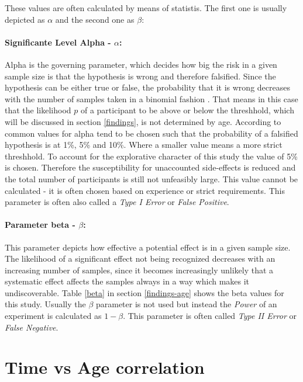             These values are often calculated by means of statistis. The first one is usually depicted as $\alpha$ and the second one as $\beta$:

            \paragraph{Significante Level Alpha - $\alpha$:} Alpha is the governing parameter, which decides how big the risk in a given sample size is that the hypothesis is wrong and therefore falsified. Since the hypothesis can be either true or false, the probability that it is wrong decreases with the number of samples taken in a binomial fashion \cite[103]{Siebertz.2017}. That means in this case that the likelihood $p$ of a participant to be above or below the threshhold, which will be discussed in section \ref*{findings}, is not determined by age. According to \cite[110]{Siebertz.2017} common values for alpha tend to be chosen such that the probability of a falsified hypothesis is at 1\%, 5\% and 10\%. Where a smaller value means a more strict threshhold. To account for the explorative character of this study the value of 5\% is chosen. Therefore the susceptibility for unaccounted side-effects is reduced and the total number of participants is still not unfeasibly large. This value cannot be calculated - it is often chosen based on experience or strict requirements. This parameter is often also called a \textit{Type I Error} or \textit{False Positive}. 

            \paragraph{Parameter beta - $\beta$:} This parameter depicts how effective a potential effect is in a given sample size. The likelihood of a significant effect not being recognized decreases with an increasing number of samples, since it becomes increasingly unlikely that a systematic effect affects the samples always in a way which makes it undiscoverable. Table \ref*{beta} in section \ref*{findings-age} shows the beta values for this study. Usually the $\beta$ parameter is not used but instead the \textit{Power} of an experiment is calculated as $1-\beta$. This parameter is often called \textit{Type II Error} or \textit{False Negative}.
                 
        \section{Time vs Age correlation}\label{correlation}

